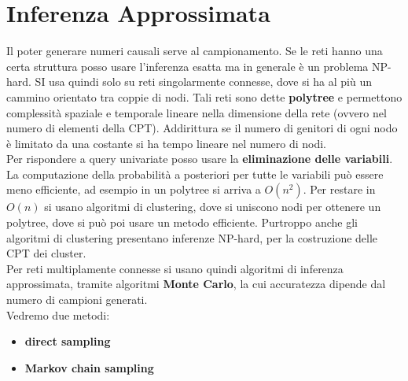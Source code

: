 \message{ !name(modprob.tex)}\documentclass[a4paper,12pt, oneside]{book}
\begin{document}
\section{Inferenza Approssimata}
Il poter generare numeri causali serve al campionamento. Se le reti hanno una
certa struttura posso usare l'inferenza esatta ma in generale è un problema
NP-hard. SI usa quindi solo su reti singolarmente connesse, dove si ha al più un
cammino orientato tra coppie di nodi. Tali reti sono dette \textbf{polytree} e
permettono complessità spaziale e temporale lineare nella dimensione della rete
(ovvero nel numero di elementi della CPT). Addirittura se il numero di genitori
di ogni nodo è limitato da una costante si ha tempo lineare nel numero di
nodi.\\
Per rispondere a query univariate posso usare la \textbf{eliminazione delle
  variabili}.\\
La computazione della probabilità a posteriori per tutte le variabili può essere
meno efficiente, ad esempio in un polytree si arriva a $O(n^2)$. Per restare in
$O(n)$ si usano algoritmi di clustering, dove si uniscono nodi per ottenere un
polytree, dove si può poi usare un metodo efficiente. Purtroppo anche gli
algoritmi di clustering presentano inferenze NP-hard, per la costruzione delle
CPT dei cluster.\\
Per reti multiplamente connesse si usano quindi algoritmi di inferenza
approssimata, tramite algoritmi \textbf{Monte Carlo}, la cui accuratezza dipende
dal numero di campioni generati.\\
Vedremo due metodi:
\begin{itemize}
  \item \textbf{direct sampling}
  \item \textbf{Markov chain sampling}
\end{itemize}
\end{document}
